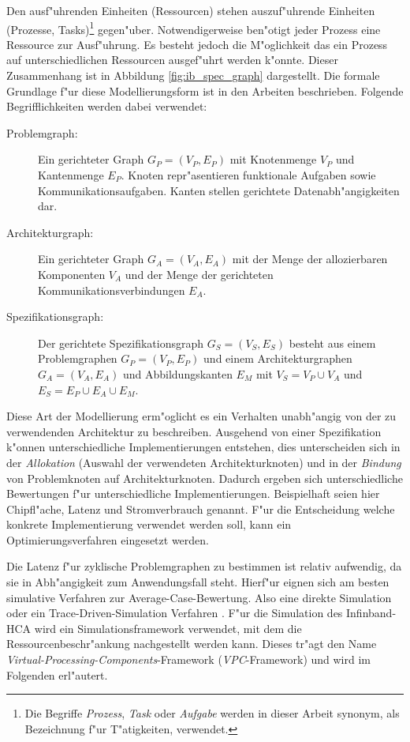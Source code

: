 Den ausf"uhrenden Einheiten (Ressourcen) stehen auszuf"uhrende Einheiten
(Prozesse, Tasks)\footnote{Die Begriffe \emph{Prozess}, \emph{Task} oder
  \emph{Aufgabe} werden in dieser Arbeit synonym, als Bezeichnung f"ur
  T"atigkeiten, verwendet.}  gegen"uber. Notwendigerweise ben"otigt
jeder Prozess eine Ressource zur Ausf"uhrung. Es besteht jedoch die
M"oglichkeit das ein Prozess auf unterschiedlichen Ressourcen ausgef"uhrt
werden k"onnte. Dieser Zusammenhang ist in Abbildung \ref{fig:ib_spec_graph}
dargestellt. Die formale Grundlage f"ur diese Modellierungsform ist in den 
Arbeiten \cite{btt:1998, teich:1997} beschrieben. Folgende Begrifflichkeiten 
werden dabei verwendet:
\begin{description}
\item[Problemgraph:] Ein gerichteter Graph $G_P = (V_P,E_P)$ mit Knotenmenge $V_P$ 
und Kantenmenge $E_P$. Knoten repr"asentieren funktionale Aufgaben sowie 
Kommunikationsaufgaben. Kanten stellen gerichtete Datenabh"angigkeiten dar.
\item[Architekturgraph:] Ein gerichteter Graph $G_A = (V_A,E_A)$ mit der 
Menge der allozierbaren Komponenten $V_A$ und der Menge der gerichteten 
Kommunikationsverbindungen $E_A$.
\item[Spezifikationsgraph:] Der gerichtete Spezifikationsgraph $G_S = (V_S,E_S)$ besteht aus einem Problemgraphen $G_P = (V_P,E_P)$ und einem Architekturgraphen $G_A = (V_A,E_A)$ und Abbildungskanten $E_M$ mit $V_S = V_P \cup V_A$ und $E_S = E_P \cup E_A \cup E_M$.
\end{description}
Diese Art der Modellierung erm"oglicht es ein Verhalten unabh"angig von der zu 
verwendenden Architektur zu beschreiben. Ausgehend von einer Spezifikation k"onnen 
unterschiedliche Implementierungen entstehen, dies unterscheiden sich in der \emph{Allokation}
(Auswahl der verwendeten Architekturknoten) und in der \emph{Bindung} von Problemknoten auf 
Architekturknoten. Dadurch ergeben sich unterschiedliche Bewertungen f"ur 
unterschiedliche Implementierungen. Beispielhaft seien hier Chipfl"ache, 
Latenz und Stromverbrauch genannt. F"ur die Entscheidung welche konkrete
Implementierung verwendet werden soll, kann ein Optimierungsverfahren 
eingesetzt werden. 

Die Latenz f"ur zyklische Problemgraphen zu bestimmen ist relativ 
aufwendig, da sie in Abh"angigkeit zum Anwendungsfall steht. Hierf"ur 
eignen sich am besten simulative Verfahren zur Average-Case-Bewertung.
Also eine direkte Simulation oder ein Trace-Driven-Simulation 
Verfahren \cite{lrd:2001}. F"ur die Simulation des Infinband-HCA
 wird ein Simulationsframework verwendet, mit dem die 
Ressourcenbeschr"ankung nachgestellt werden kann. Dieses 
tr"agt den Name \emph{Virtual-Processing-Components}-Framework 
(\emph{VPC}-Framework) und wird im Folgenden erl"autert.

